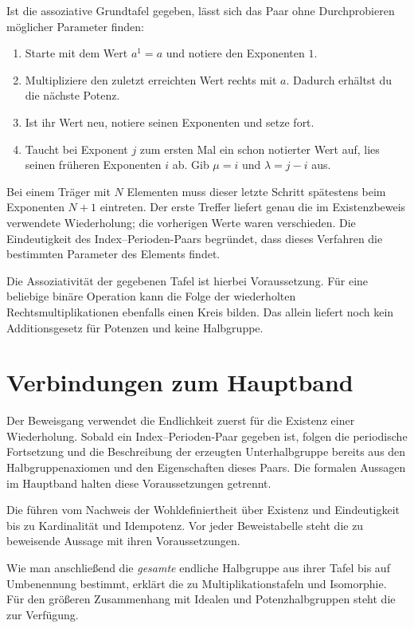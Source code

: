 Ist die assoziative Grundtafel gegeben, lässt sich das Paar ohne
Durchprobieren möglicher Parameter finden:
\begin{enumerate}
 \item Starte mit dem Wert \(a^1=a\) und notiere den Exponenten \(1\).
 \item Multipliziere den zuletzt erreichten Wert rechts mit \(a\).
       Dadurch erhältst du die nächste Potenz.
 \item Ist ihr Wert neu, notiere seinen Exponenten und setze fort.
 \item Taucht bei Exponent \(j\) zum ersten Mal ein schon
       notierter Wert auf, lies seinen früheren Exponenten \(i\) ab.
       Gib \(\mu=i\) und \(\lambda=j-i\) aus.
\end{enumerate}
Bei einem Träger mit \(N\) Elementen muss dieser letzte Schritt
spätestens beim Exponenten \(N+1\) eintreten.
Der erste Treffer liefert genau die im Existenzbeweis verwendete
Wiederholung; die vorherigen Werte waren verschieden.
Die Eindeutigkeit des Index--Perioden-Paars begründet, dass dieses
Verfahren die bestimmten Parameter des Elements findet.

Die Assoziativität der gegebenen Tafel ist hierbei Voraussetzung.
Für eine beliebige binäre Operation kann die Folge der wiederholten
Rechtsmultiplikationen ebenfalls einen Kreis bilden. Das allein
liefert noch kein Additionsgesetz für Potenzen und keine Halbgruppe.

\section*{Verbindungen zum Hauptband}

Der Beweisgang verwendet die Endlichkeit zuerst für die Existenz einer
Wiederholung. Sobald ein Index--Perioden-Paar gegeben ist, folgen die
periodische Fortsetzung und die Beschreibung der erzeugten Unterhalbgruppe
bereits aus den Halbgruppenaxiomen und den Eigenschaften dieses Paars.
Die formalen Aussagen im Hauptband halten diese Voraussetzungen getrennt.

Die \IndexPeriodProofsLink{} führen vom Nachweis der
Wohldefiniertheit über Existenz und Eindeutigkeit bis zu
Kardinalität und Idempotenz. Vor jeder Beweistabelle steht die
zu beweisende Aussage mit ihren Voraussetzungen.

Wie man anschließend die \emph{gesamte} endliche Halbgruppe aus
ihrer Tafel bis auf Umbenennung bestimmt, erklärt die
\TableIsomorphismsReadingLink{} zu Multiplikationstafeln und Isomorphie.
Für den größeren Zusammenhang mit Idealen und Potenzhalbgruppen steht
die \FiniteSemigroupsReadingLink{} zur Verfügung.

